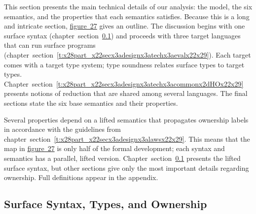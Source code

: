 \documentclass[ twoside,open=right,titlepage,numbers=noenddot,headinclude,%
                footinclude=true,cleardoublepage=empty,abstract=off,
                BCOR=5mm,paper=a4,fontsize=11pt,%
                ngerman,american,%
                parts,pdfspacing]{scrreprt}
\newcommand{\SecRef}[2]{section~#1}
\newcommand{\SecRefLocal}[3]{\hyperref[#1]{\SecRef{#2}{#3}}}
\newcommand{\Ssubsubsection}[2]{\subsubsection[#1]{#2}}
\newcommand{\FigureRef}[2]{#1}
\renewcommand{\Ssubsubsection}[2]{\subsection[#1]{#2}}
\renewcommand{\SecRefLocal}[3]{section~\ref{#1}}
\begin{document}
This section presents the main technical details of our analysis: the model,
 the six semantics, and the properties that each semantics satisfies.
Because this is a long and intricate section, \hyperref[t:x28counter_x28x22figurex22_x22figx3atechnicalx2doutlinex22x29x29]{figure~\FigureRef{27}{t:x28counter_x28x22figurex22_x22figx3atechnicalx2doutlinex22x29x29}} gives an outline.
The discussion begins with one surface syntax (chapter~\SecRefLocal{t:x28part_x22secx3adesignx3asurfacex2dlanguagex22x29}{4.5.1}{Surface Syntax, Types, and Ownership})
 and proceeds with three target languages that can run surface programs (chapter~\SecRefLocal{t:x28part_x22secx3adesignx3atechx3aevalx22x29}{4.5.2}{Three Evaluation Syntaxes}).
Each target comes with a target type system; type soundness relates
 surface types to target types.
Chapter~\SecRefLocal{t:x28part_x22secx3adesignx3atechx3acommonx2dHOx22x29}{4.5.4}{Common Higher{-}Order Notions of Reduction} presents notions of reduction that are shared
 among several languages.
The final sections state the six base semantics and their properties.

Several properties depend on a lifted semantics that propagates
 ownership labels in accordance with the guidelines from chapter~\SecRefLocal{t:x28part_x22secx3adesignx3alawsx22x29}{4.4.4.1}{How to lift a reduction relation}.
This means that the map in \hyperref[t:x28counter_x28x22figurex22_x22figx3atechnicalx2doutlinex22x29x29]{figure~\FigureRef{27}{t:x28counter_x28x22figurex22_x22figx3atechnicalx2doutlinex22x29x29}} is only half
 of the formal development; each syntax and semantics has a parallel, lifted version.
Chapter~\SecRefLocal{t:x28part_x22secx3adesignx3asurfacex2dlanguagex22x29}{4.5.1}{Surface Syntax, Types, and Ownership} presents the lifted surface syntax, but other
 sections give only the most important details regarding ownership.
Full definitions appear in the appendix.

\Ssubsubsection{Surface Syntax, Types, and Ownership}{Surface Syntax, Types, and Ownership}\label{t:x28part_x22secx3adesignx3asurfacex2dlanguagex22x29}

\label{sec:design:surface-language}
\end{document}
